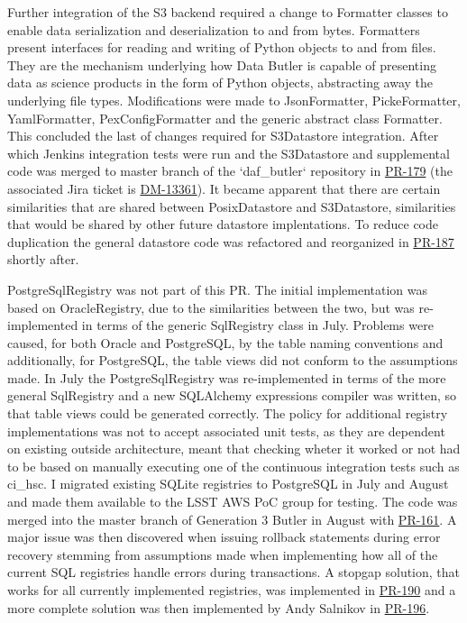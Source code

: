Further integration of the S3 backend required a change to Formatter classes to enable data serialization and deserialization to and from bytes. Formatters present interfaces for reading and writing of Python objects to and from files. They are the mechanism underlying how Data Butler is capable of presenting data as science products in the form of Python objects, abstracting away the underlying file types. Modifications were made to JsonFormatter, PickeFormatter, YamlFormatter, PexConfigFormatter and the generic abstract class Formatter. This concluded the last of changes required for S3Datastore integration. After which Jenkins integration tests were run and the S3Datastore and supplemental code was merged to master branch of the `daf\_butler` repository in \href{https://github.com/lsst/daf_butler/pull/179}{PR-179} (the associated Jira ticket is \href{https://jira.lsstcorp.org/browse/DM-13361}{DM-13361}). It became apparent that there are certain similarities that are shared between PosixDatastore and S3Datastore, similarities that would be shared by other future datastore implentations. To reduce code duplication the general datastore code was refactored and reorganized in \href{https://github.com/lsst/daf_butler/pull/187}{PR-187} shortly after. 

PostgreSqlRegistry was not part of this PR. The initial implementation was based on OracleRegistry, due to the similarities between the two, but was re-implemented in terms of the generic SqlRegistry class in July. Problems were caused, for both Oracle and PostgreSQL, by the table naming conventions and additionally, for PostgreSQL, the table views did not conform to the assumptions made. In July the PostgreSqlRegistry was re-implemented in terms of the more general SqlRegistry and a new SQLAlchemy expressions compiler was written, so that table views could be generated correctly. The policy for additional registry implementations was not to accept associated unit tests, as they are dependent on existing outside architecture, meant that checking wheter it worked or not had to be based on manually executing one of the continuous integration tests such as ci\_hsc. I migrated existing SQLite registries to PostgreSQL in July and August and made them available to the LSST AWS PoC group for testing. The code was merged into the master branch of Generation 3 Butler in August with \href{https://github.com/lsst/daf_butler/pull/161}{PR-161}. A major issue was then discovered when issuing rollback statements during error recovery stemming from assumptions made when implementing how all of the current SQL registries handle errors during transactions. A stopgap solution, that works for all currently implemented registries, was implemented in \href{https://github.com/lsst/daf_butler/pull/190}{PR-190} and a more complete solution was then implemented by Andy Salnikov in \href{https://github.com/lsst/daf_butler/pull/196}{PR-196}.



